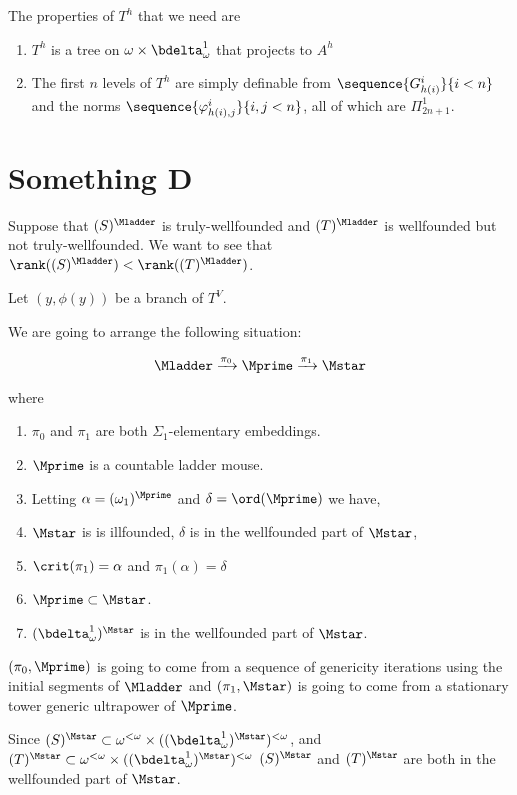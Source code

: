 \documentclass[oneside,12pt]{amsart}
\begin{document}
The properties of $T^h$ that we need are
\begin{enumerate}
\item $T^h$ is a tree on $\omega\times\bdelta^1_{\omega}$ that projects to $A^h$
\item The first $n$ levels of $T^h$ are simply definable from $\sequence{G^i_{h(i)}}{i<n}$ and
the norms $\sequence{\varphi^i_{h(i), j}}{i,j<n}$, all of which are $\Pi^1_{2n+1}$.
\end{enumerate}

\section{Something D}
\label{section:somethingd}

Suppose that $(S)^{\Mladder}$ is truly-wellfounded and $(T)^{\Mladder}$ is
wellfounded but not truly-wellfounded. We want to see that
$\rank((S)^{\Mladder}) < \rank((T)^{\Mladder})$.

Let $(y,\phi(y))$ be a branch of $T^V$.


We are going to arrange the following situation:

\begin{equation}
\label{big-setup}
\Mladder \xrightarrow{\pi_0} \Mprime \xrightarrow{\pi_1} \Mstar
\end{equation}

where

\begin{enumerate}
\item $\pi_0$ and $\pi_1$ are both $\Sigma_1$-elementary embeddings.
\item $\Mprime$ is a countable ladder mouse.
\item Letting $\alpha=(\omega_1)^{\Mprime}$ and $\delta=\ord(\Mprime)$ we have,
\item $\Mstar$ is is illfounded, $\delta$ is in the wellfounded part of $\Mstar$,
\item $\crit(\pi_1) = \alpha$ and $\pi_1(\alpha)=\delta$
\item $\Mprime \subset \Mstar$.
\item $(\bdelta^1_\omega)^{\Mstar}$ is in the wellfounded part of $\Mstar$.
\end{enumerate}

$(\pi_0, \Mprime)$ is going to come from a sequence of genericity iterations using
the initial segments of $\Mladder$ and $(\pi_1,\Mstar)$
is going to come from a stationary tower generic ultrapower of $\Mprime$.

Since $(S)^{\Mstar} \subset \omega^{<\omega}\times ((\bdelta^1_\omega)^{\Mstar})^{<\omega}$,
and
$(T)^{\Mstar} \subset \omega^{<\omega}\times ((\bdelta^1_\omega)^{\Mstar})^{<\omega}$
$(S)^{\Mstar}$ and $(T)^{\Mstar}$ are both in the wellfounded part of $\Mstar$.
\end{document}
